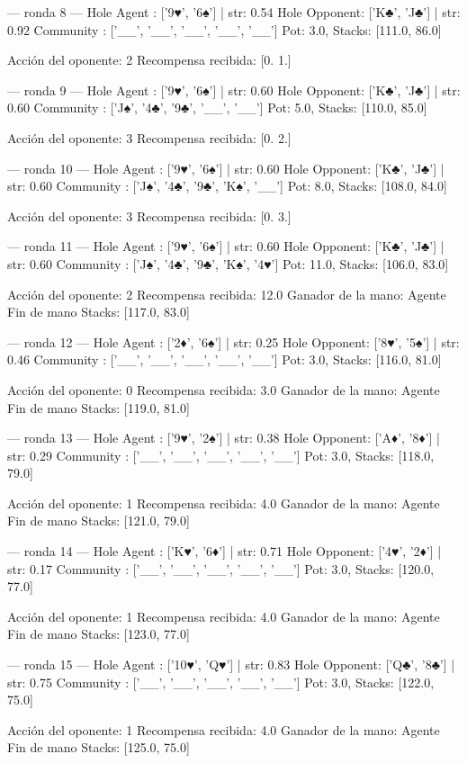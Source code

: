 --- ronda 8 ---
Hole Agent : ['9♥', '6♠'] | str: 0.54
Hole Opponent: ['K♣', 'J♣'] | str: 0.92
Community  : ['__', '__', '__', '__', '__']
Pot: 3.0, Stacks: [111.0, 86.0]

Acción del oponente: 2
Recompensa recibida: [0. 1.]

--- ronda 9 ---
Hole Agent : ['9♥', '6♠'] | str: 0.60
Hole Opponent: ['K♣', 'J♣'] | str: 0.60
Community  : ['J♠', '4♣', '9♣', '__', '__']
Pot: 5.0, Stacks: [110.0, 85.0]

Acción del oponente: 3
Recompensa recibida: [0. 2.]

--- ronda 10 ---
Hole Agent : ['9♥', '6♠'] | str: 0.60
Hole Opponent: ['K♣', 'J♣'] | str: 0.60
Community  : ['J♠', '4♣', '9♣', 'K♠', '__']
Pot: 8.0, Stacks: [108.0, 84.0]

Acción del oponente: 3
Recompensa recibida: [0. 3.]

--- ronda 11 ---
Hole Agent : ['9♥', '6♠'] | str: 0.60
Hole Opponent: ['K♣', 'J♣'] | str: 0.60
Community  : ['J♠', '4♣', '9♣', 'K♠', '4♥']
Pot: 11.0, Stacks: [106.0, 83.0]

Acción del oponente: 2
Recompensa recibida: 12.0
Ganador de la mano: Agente
Fin de mano Stacks: [117.0, 83.0]


--- ronda 12 ---
Hole Agent : ['2♦', '6♠'] | str: 0.25
Hole Opponent: ['8♥', '5♠'] | str: 0.46
Community  : ['__', '__', '__', '__', '__']
Pot: 3.0, Stacks: [116.0, 81.0]

Acción del oponente: 0
Recompensa recibida: 3.0
Ganador de la mano: Agente
Fin de mano Stacks: [119.0, 81.0]


--- ronda 13 ---
Hole Agent : ['9♥', '2♠'] | str: 0.38
Hole Opponent: ['A♦', '8♦'] | str: 0.29
Community  : ['__', '__', '__', '__', '__']
Pot: 3.0, Stacks: [118.0, 79.0]

Acción del oponente: 1
Recompensa recibida: 4.0
Ganador de la mano: Agente
Fin de mano Stacks: [121.0, 79.0]


--- ronda 14 ---
Hole Agent : ['K♥', '6♦'] | str: 0.71
Hole Opponent: ['4♥', '2♦'] | str: 0.17
Community  : ['__', '__', '__', '__', '__']
Pot: 3.0, Stacks: [120.0, 77.0]

Acción del oponente: 1
Recompensa recibida: 4.0
Ganador de la mano: Agente
Fin de mano Stacks: [123.0, 77.0]


--- ronda 15 ---
Hole Agent : ['10♥', 'Q♥'] | str: 0.83
Hole Opponent: ['Q♣', '8♣'] | str: 0.75
Community  : ['__', '__', '__', '__', '__']
Pot: 3.0, Stacks: [122.0, 75.0]

Acción del oponente: 1
Recompensa recibida: 4.0
Ganador de la mano: Agente
Fin de mano Stacks: [125.0, 75.0]


